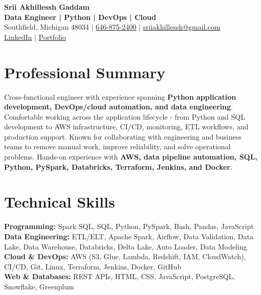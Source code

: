 \documentclass[letterpaper,10pt]{article}
\begin{document}
\fontsize{9.35pt}{10.45pt}\selectfont

\begin{center}
    {\LARGE \textbf{Srii Akhillessh Gaddam}} \\[-1pt]
    \textbf{Data Engineer | Python | DevOps | Cloud} \\[2pt]
    Southfield, Michigan 48034 $|$
    \href{tel:6468752400}{646-875-2400} $|$
    \href{mailto:sriiakhillessh@gmail.com}{sriiakhillessh@gmail.com} \\[1pt]
    \href{https://www.linkedin.com/in/srii-akhiilessh-gaddam-b48668191/}{LinkedIn} $|$
    \href{https://sriiakhillesshg.github.io/portfolio/}{Portfolio}
\end{center}
\vspace{-8pt}

\section{Professional Summary}
\small{Cross-functional engineer with experience spanning \textbf{Python application development, DevOps/cloud automation, and data engineering}. Comfortable working across the application lifecycle - from Python and SQL development to AWS infrastructure, CI/CD, monitoring, ETL workflows, and production support. Known for collaborating with engineering and business teams to remove manual work, improve reliability, and solve operational problems. Hands-on experience with \textbf{AWS, data pipeline automation, SQL, Python, PySpark, Databricks, Terraform, Jenkins, and Docker}.}

\section{Technical Skills}
\small{
\textbf{Programming:} Spark SQL, SQL, Python, PySpark, Bash, Pandas, JavaScript \\
\textbf{Data Engineering:} ETL/ELT, Apache Spark, Airflow, Data Validation, Data Lake, Data Warehouse, Databricks, Delta Lake, Auto Loader, Data Modeling \\
\textbf{Cloud \& DevOps:} AWS (S3, Glue, Lambda, Redshift, IAM, CloudWatch), CI/CD, Git, Linux, Terraform, Jenkins, Docker, GitHub \\
\textbf{Web \& Databases:} REST APIs, HTML, CSS, JavaScript, PostgreSQL, Snowflake, Greenplum
}
\end{document}
